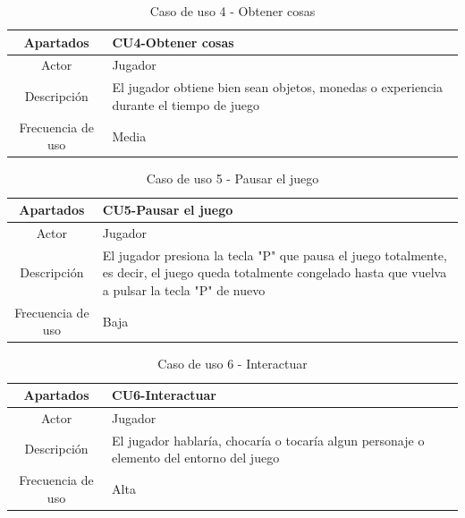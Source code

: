 \documentclass[a4paper]{article}
\begin{document}
\begin{table}[ht]
    \centering
    \begin{tabular}{|c|p{14cm}|} 
        \hline
        \textbf{Apartados}       & \textbf{CU4-Obtener cosas} \\
        \hline
        Actor                    & Jugador \\
        \hline
        Descripción              & El jugador obtiene bien sean objetos, monedas o experiencia durante el tiempo de juego \\
        \hline
        Frecuencia de uso        & Media \\
        \hline
    \end{tabular}
    \caption{Caso de uso 4 - Obtener cosas}
    \label{tab:casosdeuso-table}
\end{table}

\begin{table}[ht]
    \centering
    \begin{tabular}{|c|p{14cm}|} 
        \hline
        \textbf{Apartados}       & \textbf{CU5-Pausar el juego} \\
        \hline
        Actor                    & Jugador \\
        \hline
        Descripción              & El jugador presiona la tecla "P" que pausa el juego totalmente, es decir, el juego queda totalmente congelado hasta que vuelva a pulsar la tecla "P" de nuevo \\
        \hline
        Frecuencia de uso        & Baja \\
        \hline
    \end{tabular}
    \caption{Caso de uso 5 - Pausar el juego}
    \label{tab:casosdeuso-table}
\end{table}

\begin{table}[ht]
    \centering
    \begin{tabular}{|c|p{14cm}|} 
        \hline
        \textbf{Apartados}       & \textbf{CU6-Interactuar} \\
        \hline
        Actor                    & Jugador \\
        \hline
        Descripción              & El jugador hablaría, chocaría o tocaría algun personaje o elemento del entorno del juego \\
        \hline
        Frecuencia de uso        & Alta \\
        \hline
    \end{tabular}
    \caption{Caso de uso 6 - Interactuar}
    \label{tab:casosdeuso-table}
\end{table}
\end{document}
